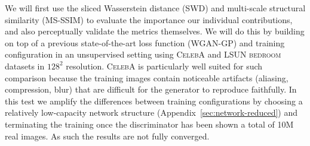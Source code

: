 We will first use the sliced Wasserstein distance (SWD) and multi-scale structural similarity (MS-SSIM) \citep{Odena2017} to evaluate the importance our individual contributions, and also perceptually validate the metrics themselves. We will do this by building on top of a previous state-of-the-art loss function (WGAN-GP) and training configuration \citep{Gulrajani2017} in an unsupervised setting using \textsc{CelebA} \citep{CelebA} and \textsc{LSUN bedroom} \citep{LSUN} datasets in $128^2$ resolution. \textsc{CelebA} is particularly well suited for such comparison because the training images contain noticeable artifacts (aliasing, compression, blur) that are difficult for the generator to reproduce faithfully. In this test we amplify the differences between training configurations by choosing a relatively low-capacity network structure (Appendix~\ref{sec:network-reduced}) and terminating the training once the discriminator has been shown a total of 10M real images. As such the results are not fully converged.

